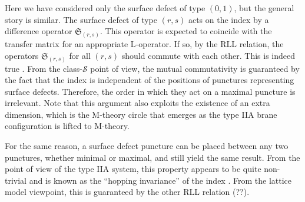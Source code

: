 Here we have considered only the surface defect of type $(0,1)$,
but the general story is similar. The surface defect of type $(r,s)$
acts on the index by a difference operator $\mathfrak{S}_{(r,s)}$.
This operator is expected to coincide with the transfer matrix for
an appropriate L-operator. If so, by the RLL relation, the operators
$\mathfrak{S}_{(r,s)}$ for all $(r,s)$ should commute with each
other. This is indeed true \cite{Gaiotto:2012xa}. From the class-$\mathcal{S}$
point of view, the mutual commutativity is guaranteed by the fact
that the index is independent of the positions of punctures representing
surface defects. Therefore, the order in which they act on a maximal
puncture is irrelevant. Note that this argument also exploits the
existence of an extra dimension, which is the M-theory circle that
emerges as the type IIA brane configuration is lifted to M-theory.

For the same reason, a surface defect puncture can be placed between
any two punctures, whether minimal or maximal, and still yield the
same result. From the point of view of the type IIA system, this property
appears to be quite non-trivial and is known as the ``hopping invariance''
of the index \cite{Gadde:2013dda}. From the lattice model viewpoint,
this is guaranteed by the other RLL relation (??). 












